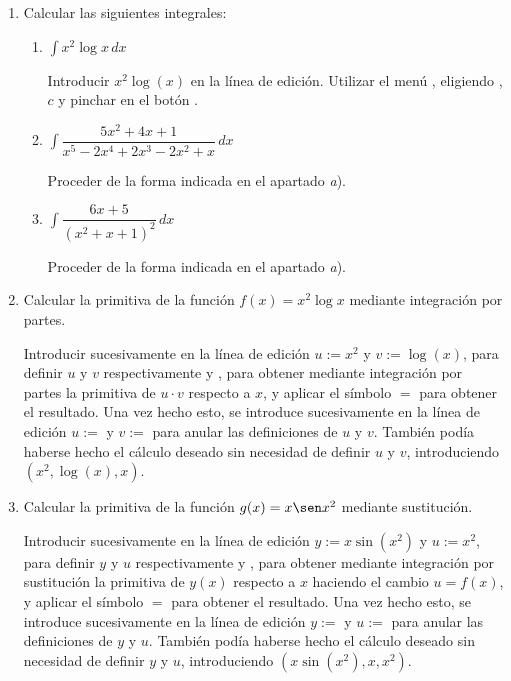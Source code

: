 \begin{enumerate}[leftmargin=*]
\item Calcular las siguientes integrales:

\begin{enumerate}
\item $ \int{x^{2} \log{x}\,dx}$

\begin{indication}
{Introducir $x^{2}\log(x)$ en la línea de edición. Utilizar el menú
, eligiendo ,
 $c$ y pinchar en el botón . }
\end{indication}

\item $ \int{\dfrac{5x^{2}+4x+1}{x^{5}-2x^{4}+2x^{3}-2x^{2}+x}\,dx}$
\begin{indication}
{Proceder de la forma indicada en el apartado \emph{a}). }
\end{indication}

\item $ \int{\dfrac{6x+5}{(x^{2}+x+1)^{2}}\,dx}$
\begin{indication}
{Proceder de la forma indicada en el apartado \emph{a}). }
\end{indication}
\end{enumerate}

\item Calcular la primitiva de la función $f(x)=x^{2}\log x$ mediante integración por partes.
\begin{indication}
{Introducir sucesivamente en la línea de edición $u:=x^{2}$ y
$v:=\log(x)$, para definir $u$ y $v$ respectivamente y
, para obtener mediante integración por
partes la primitiva de $u \cdot v$ respecto a $x$, y aplicar el
símbolo $=$ para obtener el resultado. Una vez hecho esto, se
introduce sucesivamente en la línea de edición $u:=$ y $v:=$ para
anular las definiciones de $u$ y $v$. También podía haberse hecho el
cálculo deseado sin necesidad de definir $u$ y $v$, introduciendo
$(x^2,\log(x),x)$. }
\end{indication}

\item Calcular la primitiva de la función $g(x)=x\sen x^2$ mediante sustitución.
\begin{indication}
{ Introducir sucesivamente en la línea de edición $y:=x\sin(x^{2})$
y $u:=x^{2}$, para definir $y$ y $u$ respectivamente y
, para obtener mediante integración por
sustitución la primitiva de $y(x)$ respecto a $x$ haciendo el cambio
$u=f(x)$, y aplicar el símbolo $=$ para obtener el resultado. Una
vez hecho esto, se introduce sucesivamente en la línea de edición
$y:=$ y $u:=$ para anular las definiciones de $y$ y $u$. También
podía haberse hecho el cálculo deseado sin necesidad de definir $y$
y $u$, introduciendo $(x \sin(x^{2}),x,x^2)$. }
\end{indication}
\end{enumerate}

